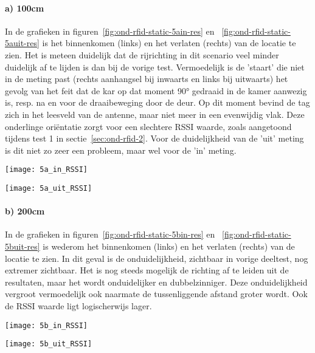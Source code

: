 \paragraph{a) 100cm}
In de grafieken in figuren~\ref{fig:ond-rfid-static-5ain-res} en ~\ref{fig:ond-rfid-static-5auit-res} is het binnenkomen (links) en het verlaten (rechts) van de locatie te zien. Het is meteen duidelijk dat de rijrichting in dit scenario veel minder duidelijk af te lijden is dan bij de vorige test. Vermoedelijk is de 'staart' die niet in de meting past (rechts aanhangsel bij inwaarts en links bij uitwaarts) het gevolg van het feit dat de kar op dat moment 90° gedraaid in de kamer aanwezig is, resp. na en voor de draaibeweging door de deur. Op dit moment bevind de tag zich in het leesveld van de antenne, maar niet meer in een evenwijdig vlak. Deze onderlinge oriëntatie zorgt voor een slechtere RSSI waarde, zoals aangetoond tijdens test 1 in sectie~\ref{sec:ond-rfid-2}. Voor de duidelijkheid van de 'uit' meting is dit niet zo zeer een probleem, maar wel voor de 'in' meting.

\begin{minipage}{0.42\textwidth}
	\texttt{[image: 5a\_in\_RSSI]}
	\label{fig:ond-rfid-static-5ain-res}
\end{minipage}
\hfill
\begin{minipage}{0.42\textwidth}
	\texttt{[image: 5a\_uit\_RSSI]}
	\label{fig:ond-rfid-static-5auit-res}
\end{minipage}

\paragraph{b) 200cm}
In de grafieken in figuren~\ref{fig:ond-rfid-static-5bin-res} en ~\ref{fig:ond-rfid-static-5buit-res} is wederom het binnenkomen (links) en het verlaten (rechts) van de locatie te zien. In dit geval is de onduidelijkheid, zichtbaar in vorige deeltest, nog extremer zichtbaar. Het is nog steeds mogelijk de richting af te leiden uit de resultaten, maar het wordt onduidelijker en dubbelzinniger. Deze onduidelijkheid vergroot vermoedelijk ook naarmate de tussenliggende afstand groter wordt. Ook de RSSI waarde ligt logischerwijs lager.

\begin{minipage}{0.42\textwidth}
	\texttt{[image: 5b\_in\_RSSI]}
	\label{fig:ond-rfid-static-5bin-res}
\end{minipage}
\hfill
\begin{minipage}{0.42\textwidth}
	\texttt{[image: 5b\_uit\_RSSI]}
	\label{fig:ond-rfid-static-5buit-res}
\end{minipage}

